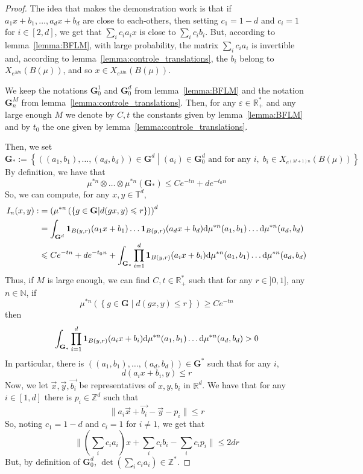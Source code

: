 \documentclass[11pt]{amsart}
\theoremstyle{definition}
\theoremstyle{remark}
\numberwithin{equation}{section}
\begin{document}
\begin{proof}
The idea that makes the demonstration work is that if $a_1 x + b_1, \dots , a_d x+b_d$ are close to each-others, then setting $c_1=1-d$ and $c_i=1$ for $i\in [2,d]$, we get that $\sum_i c_i a_i x$ is close to $\sum_i c_i b_i$. But, according to lemma~\ref{lemma:BFLM}, with large probability, the matrix $\sum_i c_i a_i$ is invertible and, according to lemma~\ref{lemma:controle_translations}, the $b_i$ belong to $X_{e^{Mn}}(B(\mu))$, and so $x\in X_{e^{Mn}}(B(\mu))$.

We keep the notations ${\mathbf G}_0^1$ and ${\mathbf G}_0^d$ from lemma~\ref{lemma:BFLM} and the notation ${\mathbf G}_n^M$ from lemma~\ref{lemma:controle_translations}. Then, for any $\varepsilon \in {\mathbb R}_+^\ast$ and any large enough $M$ we denote by $C,t$ the constants given by lemma~\ref{lemma:BFLM} and by $t_0$ the one given by lemma~\ref{lemma:controle_translations}.

Then, we set
\[
{\mathbf G}_\ast := \left\{ ((a_1,b_1), \dots, (a_d,b_d))\in {\mathbf G}^d \middle|(a_i)\in {\mathbf G}_0^d \text{ and for any }i,\; b_i \in X_{e^{(M+1)n}}(B(\mu)) \right\}
\]
By definition, we have that
\[
\mu^{\ast n} \otimes  \dots \otimes \mu^{\ast n}({\mathbf G}_\ast) \leqslant Ce^{-tn} + d e^{-t_0n}
\]
So, we can compute, for any $x,y\in {\mathbb T}^d$,
\begin{align*}
I_n(x,y):&=\left(\mu^{\ast n}\left(\left\{g\in {\mathbf G} \middle| d(gx,y)\leqslant r\right\}\right)\right)^d \\ &= \int_{{\mathbf G}^d}{\mathbf{1}}_{B(y,r)}(a_1 x+b_1) \dots {\mathbf{1}}_{B(y,r)} (a_dx+b_d) {{\rm d}}\mu^{\ast n}(a_1,b_1) \dots {{\rm d}}\mu^{\ast n}(a_d,b_d)  \\
& \leqslant Ce^{-tn} + de^{-t_0n} + \int_{{\mathbf G}_\ast} \prod_{i=1}^d{\mathbf{1}}_{B(y,r)}(a_i x+b_i) {{\rm d}}\mu^{\ast n}(a_1,b_1) \dots {{\rm d}}\mu^{\ast n}(a_d,b_d)
\end{align*}
Thus, if $M$ is large enough, we can find $C,t \in {\mathbb R}_+^\ast$ such that for any $r\in ]0,1]$, any $n\in {\mathbb N}$, if
\[
\mu^{\ast n}\left(\left\{g\in {\mathbf G} \middle| d(gx,y)\leqslant r\right\}\right) \geqslant Ce^{-tn}
\]
then
\[
\int_{{\mathbf G}_\ast} \prod_{i=1}^d{\mathbf{1}}_{B(y,r)}(a_i x+b_i) {{\rm d}}\mu^{\ast n}(a_1,b_1) \dots {{\rm d}}\mu^{\ast n}(a_d,b_d) >0
\]
In particular, there is $((a_1,b_1), \dots, (a_d,b_d))\in {\mathbf G}^\ast$ such that for any $i$,
\[
d(a_i x+b_i, y) \leqslant r
\]
Now, we let $\overrightarrow{x}, \overrightarrow{y}, \overrightarrow{b_i}$ be representatives of $x,y,b_i$ in ${\mathbb R}^d$. We have that for any $i\in [1,d]$ there is $p_i \in {\mathbb Z}^d$ such that
\[
\|a_i \overrightarrow{x} + \overrightarrow{b_i} - \overrightarrow{y} - p_i\| \leqslant r
\]
So, noting $c_1 = 1-d$ and $c_i = 1$ for $i\not=1$, we get that
\[
\| (\sum_i c_i a_i)x + \sum_i c_i b_i - \sum_i c_ip_i\| \leqslant 2d r
\]
But, by definition of ${\mathbf G}_0^d$, $\det\left(\sum_i c_i a_i \right)\in {\mathbb Z}^\ast$.


\end{proof}
\end{document}
